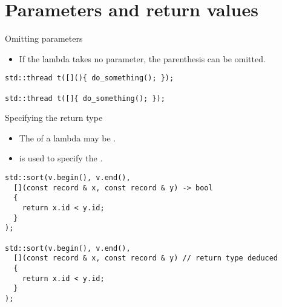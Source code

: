 \section{Parameters and return values}

\begin{frame}[t,fragile]{Omitting parameters}
  \begin{itemize}
    \item If the lambda takes no parameter, the parenthesis can be omitted.
  \end{itemize}
\begin{lstlisting}
std::thread t([](){ do_something(); });

std::thread t([]{ do_something(); });
\end{lstlisting}
\end{frame}

\begin{frame}[t,fragile]{Specifying the return type}
  \begin{itemize}
    \item The  of a lambda may be 
          .
    \item {} is used to specify the .
  \end{itemize}
\pause
\begin{lstlisting}
std::sort(v.begin(), v.end(), 
  [](const record & x, const record & y) -> bool
  { 
    return x.id < y.id;
  }
);

std::sort(v.begin(), v.end(), 
  [](const record & x, const record & y) // return type deduced
  { 
    return x.id < y.id;
  }
);

\end{lstlisting}
\end{frame}

